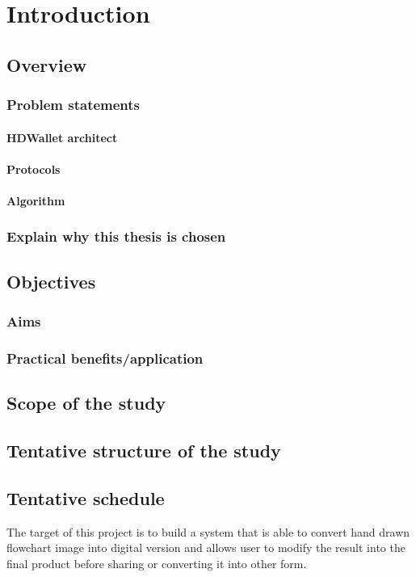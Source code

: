\chapter{Introduction} \label{Introduction}
\minitoc

\section{Overview}

\subsection{Problem statements}

\subsubsection{HDWallet architect}

\subsubsection{Protocols}

\subsubsection{Algorithm}

\subsection{Explain why this thesis is chosen}

\section{Objectives}

\subsection{Aims}

\subsection{Practical benefits/application}

\section{Scope of the study}

\section{Tentative structure of the study}

\section{Tentative schedule}


The target of this project is to build a system that is able to convert hand drawn flowchart image into digital version and allows user to modify the result into the final product before sharing or converting it into other form.